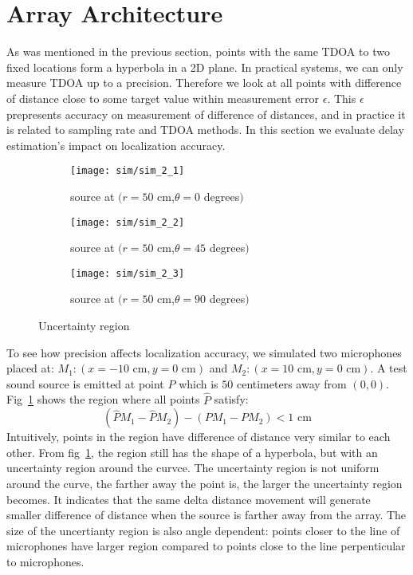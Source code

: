 \section{Array Architecture}
As was mentioned in the previous section, points with the same TDOA to two fixed locations form a hyperbola in a 2D plane. In practical systems, we can only measure TDOA up to a precision. Therefore we look at all points with difference of distance close to some target value within measurement error $\epsilon$. This $\epsilon$ prepresents accuracy on measurement of difference of distances, and in practice it is related to sampling rate and TDOA methods. In this section we evaluate delay estimation's impact on localization accuracy.

\begin{figure}[]
  \centering
  \begin{subfigure}[]{.23\textwidth}
    \texttt{[image: sim/sim\_2\_1]}
    \caption{source at $(r=50$ cm,$\theta = 0$ degrees$)$}
  \end{subfigure}
  \begin{subfigure}[]{.23\textwidth}
    \texttt{[image: sim/sim\_2\_2]}
    \caption{source at $(r=50$ cm,$\theta = 45$ degrees$)$}
  \end{subfigure}
  \begin{subfigure}[]{.23\textwidth}
    \texttt{[image: sim/sim\_2\_3]}
    \caption{source at $(r=50$ cm,$\theta = 90$ degrees$)$}
  \end{subfigure}
  \caption{Uncertainty region}
  \label{fig:sim_2_5}
\end{figure}

To see how precision affects localization accuracy, we simulated two microphones placed at: $M_1:(x=-10\mbox{ cm},y=0\mbox{ cm})$ and $M_2:(x=10\mbox{ cm},y=0\mbox{ cm})$. A test sound source is emitted at point $P$ which is $50$ centimeters away from $(0,0)$. Fig~\ref{fig:sim_2_5} shows the region where all points $\hat P$ satisfy:
\[
 (\hat P M_1 - \hat P M_2) - (P M_1 - P M_2) < 1 \mbox{ cm}
\]
Intuitively, points in the region have difference of distance very similar to each other. From fig~\ref{fig:sim_2_5}, the region still has the shape of a hyperbola, but with an uncertainty region around the curvce. The uncertainty region is not uniform around the curve, the farther away the point is, the larger the uncertainty region becomes. It indicates that the same delta distance movement will generate smaller difference of distance when the source is farther away from the array. The size of the uncertianty region is also angle dependent: points closer to the line of microphones have larger region compared to points close to the line perpenticular to microphones. 

